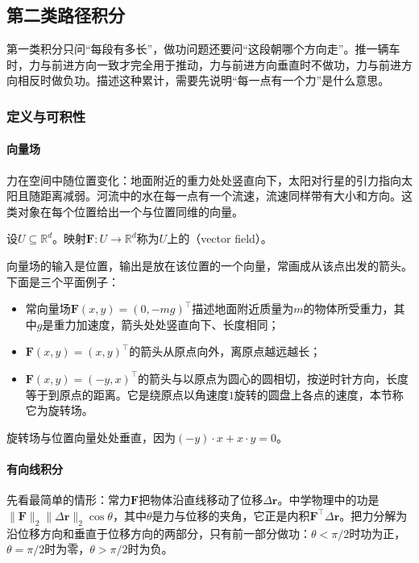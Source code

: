 \subsection{第二类路径积分}

第一类积分只问“每段有多长”，做功问题还要问“这段朝哪个方向走”。推一辆车时，力与前进方向一致才完全用于推动，力与前进方向垂直时不做功，力与前进方向相反时做负功。描述这种累计，需要先说明“每一点有一个力”是什么意思。

\subsubsection{定义与可积性}

\paragraph{向量场}

力在空间中随位置变化：地面附近的重力处处竖直向下，太阳对行星的引力指向太阳且随距离减弱。河流中的水在每一点有一个流速，流速同样带有大小和方向。这类对象在每个位置给出一个与位置同维的向量。
\begin{definition}[向量场]
设$U\subseteq\mathbb R^d$。映射$\bm F:U\to\mathbb R^d$称为$U$上的（vector field）。
\end{definition}

向量场的输入是位置，输出是放在该位置的一个向量，常画成从该点出发的箭头。下面是三个平面例子：
\begin{itemize}
 \item 常向量场$\bm F(x,y)=(0,-mg)^\top$描述地面附近质量为$m$的物体所受重力，其中$g$是重力加速度，箭头处处竖直向下、长度相同；
 \item $\bm F(x,y)=(x,y)^\top$的箭头从原点向外，离原点越远越长；
 \item $\bm F(x,y)=(-y,x)^\top$的箭头与以原点为圆心的圆相切，按逆时针方向，长度等于到原点的距离。它是绕原点以角速度$1$旋转的圆盘上各点的速度，本节称它为旋转场。
\end{itemize}
旋转场与位置向量处处垂直，因为$(-y)\cdot x+x\cdot y=0$。

\paragraph{有向线积分}

先看最简单的情形：常力$\bm F$把物体沿直线移动了位移$\Delta\bm r$。中学物理中的功是$\lVert\bm F\rVert_2\lVert\Delta\bm r\rVert_2\cos\theta$，其中$\theta$是力与位移的夹角，它正是内积$\bm F^\top\Delta\bm r$。把力分解为沿位移方向和垂直于位移方向的两部分，只有前一部分做功：$\theta<\pi/2$时功为正，$\theta=\pi/2$时为零，$\theta>\pi/2$时为负。

